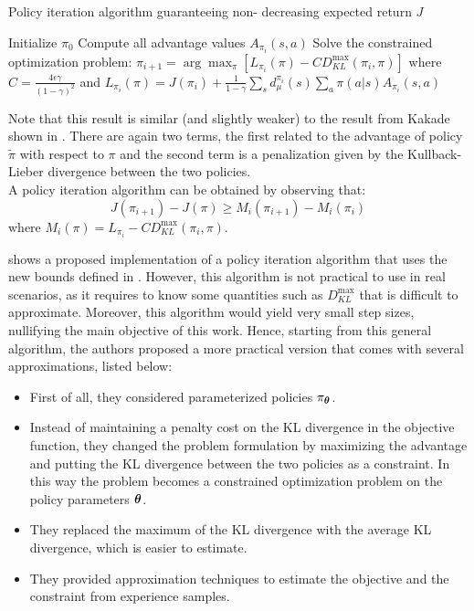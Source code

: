 \begin{algorithm}[!t]
\caption{Policy iteration algorithm guaranteeing non-
decreasing expected return $J$}
\label{alg:trpo-iteration}
\begin{algorithmic}
\State Initialize $\pi_0$
\State Compute all advantage values $A_{\pi_i}(s,a)$
\State Solve the constrained optimization problem:
\State $\pi_{i+1} = \arg\max_\pi \left[ L_{\pi_i}(\pi)-CD_{KL}^{\max}(\pi_i, \pi) \right]$
\State \qquad where $C = \frac{4\epsilon\gamma}{(1-\gamma)^2}$
\State \qquad and $L_{\pi_i}(\pi)=J(\pi_i) + \frac{1}{1-\gamma}\sum_s d_\mu^{\pi_i}(s)\sum_a\pi(a|s)A_{\pi_i}(s,a)$
\EndFor
\end{algorithmic}
\end{algorithm}

Note that this result is similar (and slightly weaker) to the result from Kakade shown in . There are again two terms, the first related to the advantage of policy $\tilde{\pi}$ with respect to $\pi$ and the second term is a penalization given by the Kullback-Lieber divergence between the two policies.\\
A policy iteration algorithm can be obtained by observing that:
\[
J(\pi_{i+1}) - J(\pi) \geq M_i(\pi_{i+1}) - M_i(\pi_i)
\]
where $M_i(\pi) = L_{\pi_i} - CD_{KL}^{\max}(\pi_i, \pi)$.

 shows a proposed implementation of a policy iteration algorithm that uses the new bounds defined in . However, this algorithm is not practical to use in real scenarios, as it requires to know some quantities such as $D_{KL}^{\max}$ that is difficult to approximate. Moreover, this algorithm would yield very small step sizes, nullifying the main objective of this work. Hence, starting from this general algorithm, the authors proposed a more practical version that comes with several approximations, listed below:
\begin{itemize}
\item First of all, they considered parameterized policies $\pi_{{\boldsymbol{\theta}}}$.
\item Instead of maintaining a penalty cost on the KL divergence in the objective function, they changed the problem formulation by maximizing the advantage and putting the KL divergence between the two policies as a constraint. In this way the problem becomes a constrained optimization problem on the policy parameters ${\boldsymbol{\theta}}$.
\item They replaced the maximum of the KL divergence with the average KL divergence, which is easier to estimate.
\item They provided approximation techniques to estimate the objective and the constraint from experience samples.
\end{itemize}

